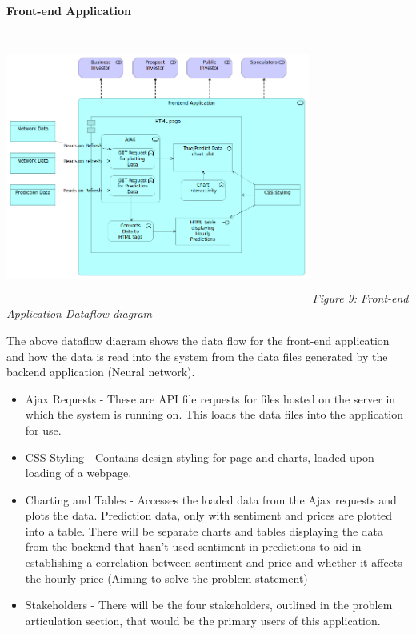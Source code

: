 \documentclass[oneside, 12pt]{article}
\begin{document}
		\textbf{Front-end Application}
		\begin{center}
			\includegraphics[width=10cm,height=9cm]{images/Frontend_Application.png}
			\newline
			\textit{Figure 9: Front-end Application Dataflow diagram}
		\end{center}
		The above dataflow diagram shows the data flow for the front-end application and how the data is read into the system from the data files generated by the backend application (Neural network).
		\begin{itemize}
			\item Ajax Requests - These are API file requests for files hosted on the server in which the system is running on. This loads the data files into the application for use.
			\item CSS Styling - Contains design styling for page and charts, loaded upon loading of a webpage.
			\item Charting and Tables - Accesses the loaded data from the Ajax requests and plots the data. Prediction data, only with sentiment and prices are plotted into a table. There will be separate charts and tables displaying the data from the backend that hasn't used sentiment in predictions to aid in establishing a correlation between sentiment and price and whether it affects the hourly price (Aiming to solve the problem statement)
			\item Stakeholders - There will be the four stakeholders, outlined in the problem articulation section, that would be the primary users of this application.
		\end{itemize}

		
\end{document}
